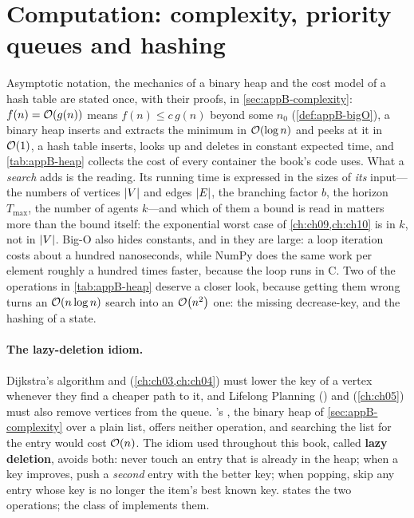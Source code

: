 \section{Computation: complexity, priority queues and hashing}
\label{sec:ch02-computation}

Asymptotic notation, the mechanics of a binary heap and the cost model of a hash table are stated once, with their proofs, in \cref{sec:appB-complexity}: $f(n)=\mathcal{O}\!\left(g(n)\right)$ means $f(n)\le c\,g(n)$ beyond some $n_0$ (\cref{def:appB-bigO}), a binary heap inserts and extracts the minimum in $\mathcal{O}\!\left(\log n\right)$ and peeks at it in $\mathcal{O}\!\left(1\right)$, a hash table inserts, looks up and deletes in constant expected time, and \cref{tab:appB-heap} collects the cost of every container the book's code uses. What a \emph{search} adds is the reading. Its running time is expressed in the sizes of \emph{its} input---the numbers of vertices $\left\lvert V \right\rvert$ and edges $\left\lvert E \right\rvert$, the branching factor $b$, the horizon $T_{\max}$, the number of agents $k$---and which of them a bound is read in matters more than the bound itself: the exponential worst case of \cref{ch:ch09,ch:ch10} is in $k$, not in $\left\lvert V \right\rvert$. Big-O also hides constants, and in \python they are large: a loop iteration costs about a hundred nanoseconds, while NumPy does the same work per element roughly a hundred times faster, because the loop runs in C. Two of the operations in \cref{tab:appB-heap} deserve a closer look, because getting them wrong turns an $\mathcal{O}\!\left(n\log n\right)$ search into an $\mathcal{O}\!\left(n^2\right)$ one: the missing decrease-key, and the hashing of a state.

\paragraph{The lazy-deletion idiom.}
Dijkstra's algorithm and \astar (\cref{ch:ch03,ch:ch04}) must lower the key of a vertex whenever they find a cheaper path to it, and Lifelong Planning \astar (\lpastar) and \dstarlite (\cref{ch:ch05}) must also remove vertices from the queue. \python's , the binary heap of \cref{sec:appB-complexity} over a plain list, offers neither operation, and searching the list for the entry would cost $\mathcal{O}\!\left(n\right)$. The idiom used throughout this book, called \textbf{lazy deletion}, avoids both: never touch an entry that is already in the heap; when a key improves, push a \emph{second} entry with the better key; when popping, skip any entry whose key is no longer the item's best known key.  states the two operations; the class  of  implements them.

